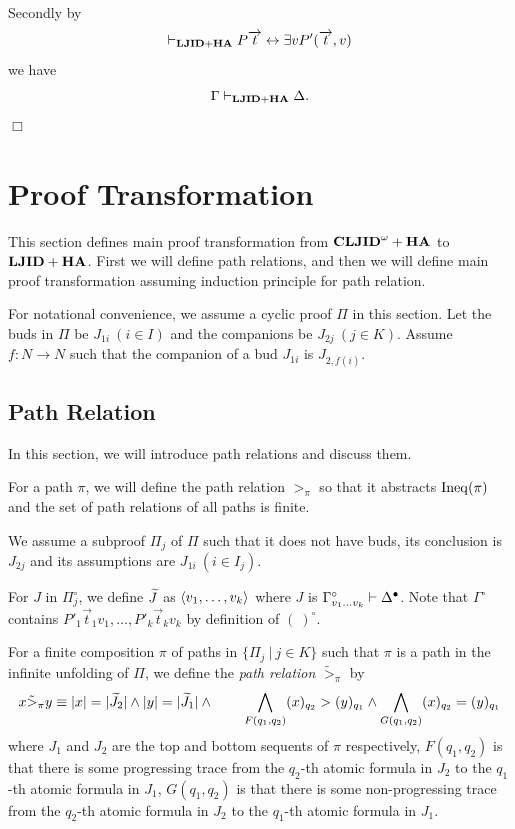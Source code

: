 Secondly
by
\[
\prove_\LJIDHA P\Vec t \lequiv \exists vP'(\Vec t,v)
\]
we have 
\[
\Gamma \prove_\LJIDHA \Delta.
\]
$\Box$

\section{Proof Transformation}\label{sec:prooftrans}

This section defines main proof transformation from $\CLJIDHA$ to $\LJIDHA$.
First we will define path relations, and then we will define main
proof transformation assuming induction principle for path relation.

For notational convenience,
we assume a cyclic proof $\Pi$ in this section.
Let the buds in $\Pi$ be $J_{1i} \ (i \in I)$ and
the companions be $J_{2j} \ (j \in K)$.
Assume $f:N \to N$ such that the companion of a bud $J_{1i}$ is $J_{2,f(i)}$.

\subsection{Path Relation}

In this section, we will introduce path relations and discuss them.

For a path $\pi$,
we will define the path relation $>_\pi$ 
so that it abstracts $\Ineq(\pi)$ and the set of path relations of all paths
is finite.

We assume a subproof $\Pi_j$ of $\Pi$ 
such that it does not have buds,
its conclusion is $J_{2j}$ and its assumptions are
$J_{1i} \ (i \in I_j)$. 

For $J$ in $\Pi^\circ_j$, we define $\Tilde J$ as $\< v_1,\ldots,v_k \>$ where
$J$ is $\Gamma^\circ_{v_1\ldots v_k} \prove \Delta^\bullet$.
Note that 
$\Gamma^\circ$ contains $P'_1\Vec t_1v_1,\ldots,P'_k\Vec t_kv_k$
by definition of $(\ )^\circ$.

\begin{Def}\rm
For a finite composition $\pi$ of paths in $\{ \Pi_j \ |\ j \in K\}$ such that
$\pi$ is a path in the infinite unfolding of $\Pi$,
we define the {\em path relation} $\tilde>_{\pi}$ by
\[
x \tilde>_{\pi} y \equiv
|x|=|\Tilde J_2| \land |y|=|\Tilde J_1| \land
\\ \qquad
\Land_{F(q_1,q_2)} (x)_{q_2} > (y)_{q_1}
\land
\Land_{G(q_1,q_2)} (x)_{q_2} = (y)_{q_1}
\]
where 
$J_1$ and $J_2$ are the top and bottom sequents of $\pi$ respectively,
$F(q_1,q_2)$ is that
there is some progressing trace from the $q_2$-th atomic formula in $ J_2$
to the $q_1$-th atomic formula in $ J_1$,
$G(q_1,q_2)$ is that
there is some non-progressing trace from the $q_2$-th atomic formula in $ J_2$ to the $q_1$-th atomic formula in $ J_1$.
\end{Def}

